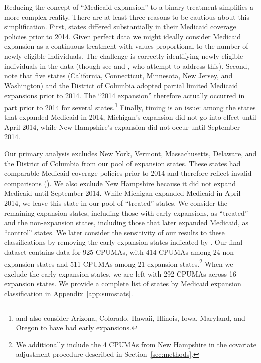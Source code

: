 \documentclass[aoas]{imsart}
\theoremstyle{plain}
\theoremstyle{remark}
\begin{document}
Reducing the concept of ``Medicaid expansion'' to a binary treatment simplifies a more complex reality. There are at least three reasons to be cautious about this simplification. First, states differed substantially in their Medicaid coverage policies prior to 2014. Given perfect data we might ideally consider Medicaid expansion as a continuous treatment with values proportional to the number of newly eligible individuals. The challenge is correctly identifying newly eligible individuals in the data (though see \cite{frean2017premium} and \cite{miller2021medicaid}, who attempt to address this). Second, \cite{frean2017premium} note that five states (California, Connecticut, Minnesota, New Jersey, and Washington) and the District of Columbia adopted partial limited Medicaid expansions prior to 2014. The ``2014 expansion'' therefore actually occurred in part prior to 2014 for several states.\footnote{\cite{kaestner2017effects} and \cite{courtemanche2017early} also consider Arizona, Colorado, Hawaii, Illinois, Iowa, Maryland, and Oregon to have had early expansions.} Finally, timing is an issue: among the states that expanded Medicaid in 2014, Michigan's expansion did not go into effect until April 2014, while New Hampshire's expansion did not occur until September 2014.

Our primary analysis excludes New York, Vermont, Massachusetts, Delaware, and the District of Columbia from our pool of expansion states. These states had comparable Medicaid coverage policies prior to 2014 and therefore reflect invalid comparisons (\cite{kaestner2017effects}). We also exclude New Hampshire because it did not expand Medicaid until September 2014. While Michigan expanded Medicaid in April 2014, we leave this state in our pool of ``treated'' states. We consider the remaining expansion states, including those with early expansions, as ``treated'' and the non-expansion states, including those that later expanded Medicaid, as ``control'' states. We later consider the sensitivity of our results to these classifications by removing the early expansion states indicated by \cite{frean2017premium}. Our final dataset contains data for 925 CPUMAs, with 414 CPUMAs among 24 non-expansion states and 511 CPUMAs among 21 expansion states.\footnote{We additionally include the 4 CPUMAs from New Hampshire in the covariate adjustment procedure described in Section~\ref{sec:methods}.} When we exclude the early expansion states, we are left with 292 CPUMAs across 16 expansion states. We provide a complete list of states by Medicaid expansion classification in Appendix~\ref{app:sumstats}.
\end{document}
